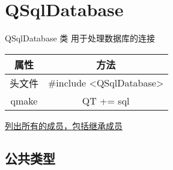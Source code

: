 \chapter{QSqlDatabase}

QSqlDatabase 类 用于处理数据库的连接

\begin{tabular}{|c|c|}
	\hline
	属性 & 方法 \\
	\hline
	头文件 & \#include <QSqlDatabase>\\      
	\hline
	qmake & QT += sql\\      
	\hline
\end{tabular}


\href{https://doc.qt.io/qt-5/qsqldatabase-members.html}{列出所有的成员，包括继承成员}

\section{公共类型}

